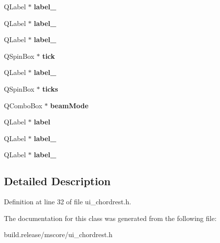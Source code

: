 \begin{DoxyCompactItemize}
Q\+Label $\ast$ {\bfseries label\+\_}
\item 
\mbox{\label{class_ui___chord_rest_base_ab17f59604d5d9d8937805251488d677b}} 
Q\+Label $\ast$ {\bfseries label\+\_}
\item 
\mbox{\label{class_ui___chord_rest_base_a94a0a373fedf0f97c2980ffb4add0b49}} 
Q\+Label $\ast$ {\bfseries label\+\_}
\item 
\mbox{\label{class_ui___chord_rest_base_a797e8f7c98656e78dd52ff3ee4dd2171}} 
Q\+Spin\+Box $\ast$ {\bfseries tick}
\item 
\mbox{\label{class_ui___chord_rest_base_a7098c23efbfe7130baf8316f6d18db61}} 
Q\+Label $\ast$ {\bfseries label\+\_}
\item 
\mbox{\label{class_ui___chord_rest_base_a4943371de8baa3de03e4ed9ce1871ae4}} 
Q\+Spin\+Box $\ast$ {\bfseries ticks}
\item 
\mbox{\label{class_ui___chord_rest_base_aad6e4096b74432edef2823c177b52ede}} 
Q\+Combo\+Box $\ast$ {\bfseries beam\+Mode}
\item 
\mbox{\label{class_ui___chord_rest_base_a535b8878d7db291d23cde3491ff012b1}} 
Q\+Label $\ast$ {\bfseries label}
\item 
\mbox{\label{class_ui___chord_rest_base_a8d684df2a4ec60ba69dcf772553ac4ed}} 
Q\+Label $\ast$ {\bfseries label\+\_}
\item 
\mbox{\label{class_ui___chord_rest_base_ac2917293fffd664e8d8eb5e678319caf}} 
Q\+Label $\ast$ {\bfseries label\+\_}
\end{DoxyCompactItemize}


\subsection{Detailed Description}


Definition at line 32 of file ui\+\_\+chordrest.\+h.



The documentation for this class was generated from the following file\+:\begin{DoxyCompactItemize}
\item 
build.\+release/mscore/ui\+\_\+chordrest.\+h\end{DoxyCompactItemize}

